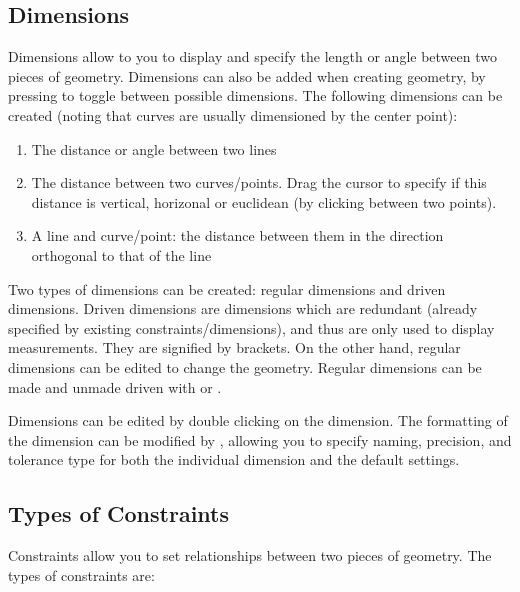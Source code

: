 \subsection{Dimensions}
Dimensions allow to you to display and specify the length or angle between two pieces of geometry. Dimensions can also be added when creating geometry, by pressing  to toggle between possible dimensions. The following dimensions can be created (noting that curves are usually dimensioned by the center point):

\begin{enumerate}
\item The distance or angle between two lines
\item The distance between two curves/points. Drag the cursor to specify if this distance is vertical, horizonal or euclidean (by clicking between two points).
\item A line and curve/point: the distance between them in the direction orthogonal to that of the line
\end{enumerate}

Two types of dimensions can be created: regular dimensions and driven dimensions. Driven dimensions are dimensions which are redundant (already specified by existing constraints/dimensions), and thus are only used to display measurements. They are signified by brackets. On the other hand, regular dimensions can be edited to change the geometry. Regular dimensions can be made and unmade driven with  or .

Dimensions can be edited by double clicking on the dimension. The formatting of the dimension can be modified by , allowing you to specify naming, precision, and tolerance type for both the individual dimension and the default settings.


\subsection{Types of Constraints}

Constraints allow you to set relationships between two pieces of geometry. The types of constraints are:

